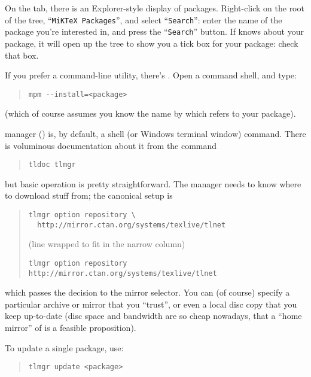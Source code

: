 On the tab, there is an Explorer-style display of packages.
Right-click on the root of the tree, ``\texttt{MiKTeX Packages}'',
and select ``\texttt{Search}'': enter the name of the package you're
interested in, and press the ``\texttt{Search}'' button.  If
\miktex{} knows about your package, it will open up the tree to show
you a tick box for your package: check that box.

If you prefer a command-line utility, there's .  Open a
command shell, and type:
\begin{quote}
\begin{verbatim}
mpm --install=<package>
\end{verbatim}
\end{quote}
(which of course assumes you know the name by which \miktex{} refers to
your package).


\texlive{} manager () is, by default, a shell (or
Windows terminal window) command.  There is voluminous documentation
about it from the command
\begin{quote}
  \texttt{tldoc tlmgr}
\end{quote}
but basic operation is pretty straightforward.  The manager needs to
know where to download stuff from; the canonical setup is
\begin{quote}
\begin{narrowversion}
\begin{verbatim}
tlmgr option repository \
  http://mirror.ctan.org/systems/texlive/tlnet
\end{verbatim}
(line wrapped to fit in the narrow column)
\end{narrowversion}
\begin{wideversion}
\begin{verbatim}
tlmgr option repository http://mirror.ctan.org/systems/texlive/tlnet
\end{verbatim}
\end{wideversion}
\end{quote}
which passes the decision to the mirror selector.  You can (of course)
specify a particular archive or mirror that you ``trust'', or even a
local disc copy that you keep up-to-date (disc space and bandwidth are
so cheap nowadays, that a ``home mirror'' of \acro{CTAN} is a feasible
proposition).

To update a single package, use:
\begin{quote}
\begin{verbatim}
tlmgr update <package>
\end{verbatim}
\end{quote}

